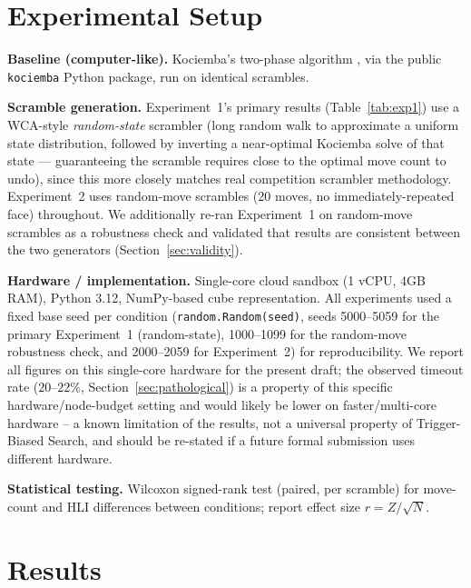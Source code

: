 \documentclass[10pt,conference]{article}
\begin{document}
\section{Experimental Setup}
\label{sec:setup}

\textbf{Baseline (computer-like).} Kociemba's two-phase algorithm
\citep{kociemba}, via the public \texttt{kociemba} Python package,
run on identical scrambles.

\textbf{Scramble generation.} Experiment~1's primary results
(Table~\ref{tab:exp1}) use a WCA-style \emph{random-state} scrambler
(long random walk to approximate a uniform state distribution,
followed by inverting a near-optimal Kociemba solve of that state ---
guaranteeing the scramble requires close to the optimal move count to
undo), since this more closely matches real competition scrambler
methodology. Experiment~2 uses random-move scrambles (20 moves, no
immediately-repeated face) throughout. We additionally re-ran
Experiment~1 on random-move scrambles as a robustness check and
validated that results are consistent between the two generators
(Section~\ref{sec:validity}).

\textbf{Hardware / implementation.} Single-core cloud sandbox (1 vCPU,
4GB RAM), Python 3.12, NumPy-based cube representation. All
experiments used a fixed base seed per condition
(\texttt{random.Random(seed)}, seeds 5000--5059 for the primary
Experiment~1 (random-state), 1000--1099 for the random-move robustness
check, and 2000--2059 for Experiment~2) for reproducibility. We report
all figures on this single-core hardware for the present draft; the
observed timeout rate ($20$--$22\%$, Section~\ref{sec:pathological}) is
a property of this specific hardware/node-budget setting and would
likely be lower on faster/multi-core hardware -- a known limitation of
the results, not a universal property of Trigger-Biased Search, and
should be re-stated if a future formal submission uses different
hardware.

\textbf{Statistical testing.} Wilcoxon signed-rank test (paired, per
scramble) for move-count and HLI differences between conditions;
report effect size $r = Z/\sqrt{N}$.

\section{Results}
\label{sec:results}
\end{document}
